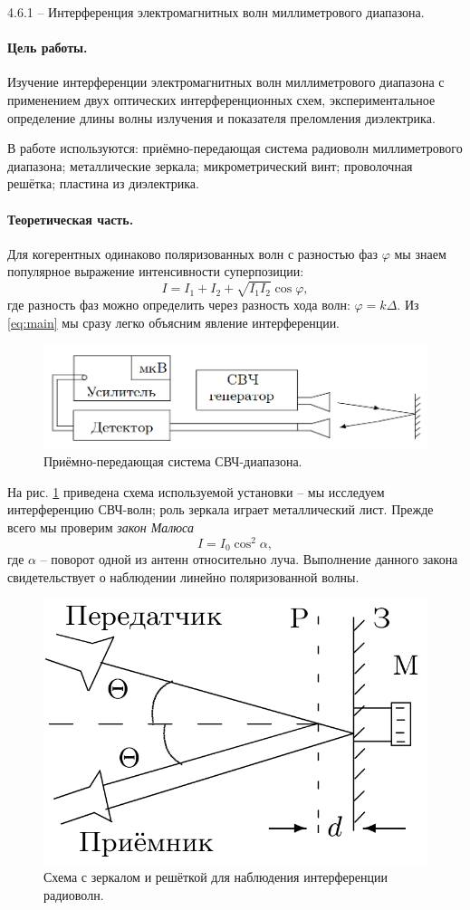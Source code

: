 \documentclass{../lab_class}
\begin{document}
{\Large 4.6.1 -- Интерференция электромагнитных волн миллиметрового диапазона.}

\paragraph{Цель работы.}
Изучение интерференции электромагнитных волн миллиметрового диапазона с применением двух оптических интерференционных схем, экспериментальное определение длины волны излучения и показателя преломления диэлектрика.

В работе используются: приёмно-передающая система радиоволн миллиметрового диапазона; металлические зеркала; микрометрический винт; проволочная решётка; пластина из диэлектрика.

\paragraph{Теоретическая часть.}
Для когерентных одинаково поляризованных волн с разностью фаз $\varphi$ мы знаем популярное выражение интенсивности суперпозиции:
\begin{equation}\label{eq:main}
	I = I_1 + I_2 + \sqrt{I_1 I_2} \cos \varphi,
\end{equation}
где разность фаз можно определить через разность хода волн: $\varphi = k \Delta$. Из \ref{eq:main} мы сразу легко объясним явление интерференции.

\begin{figure}[H]
	\centering
	\includegraphics[width = 0.5 \textwidth]{sch01.png}
	\caption{Приёмно-передающая система СВЧ-диапазона.}
	\label{fig:sch01}
\end{figure}

На рис. \ref{fig:sch01} приведена схема используемой установки -- мы исследуем интерференцию СВЧ-волн; роль зеркала играет металлический лист. Прежде всего мы проверим \emph{закон Малюса}
\begin{equation}\label{eq:Malus}
	I = I_0 \cos^2 \alpha,
\end{equation}
где $\alpha$ -- поворот одной из антенн относительно луча. Выполнение данного закона свидетельствует о наблюдении линейно поляризованной волны.

\begin{figure}[H]
	\centering
	\includegraphics[width = 0.3 \textwidth]{sch02.png}
	\caption{Схема с зеркалом и решёткой для наблюдения интерференции радиоволн.}
	\label{fig:sch02}
\end{figure}
\end{document}
